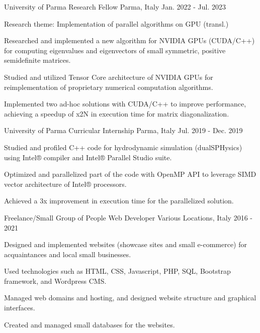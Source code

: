 \begin{cventries}
\cventry
    {University of Parma} %
    {Research Fellow} %
    {Parma, Italy} %
    {Jan. 2022 - Jul. 2023} %
    {
        \begin{cvitems} %
            \item {Research theme: Implementation of parallel algorithms on GPU (transl.)}
            \item {Researched and implemented a new algorithm for NVIDIA GPUs (CUDA/C++)
            for computing eigenvalues and eigenvectors of small symmetric, positive
            semidefinite matrices.}
            \item {Studied and utilized Tensor Core architecture of NVIDIA GPUs for
            reimplementation of proprietary numerical computation algorithms.}
            \item {Implemented two ad-hoc solutions with CUDA/C++ to improve performance,
            achieving a speedup of x2N in execution time for matrix diagonalization.}
        \end{cvitems}
    }

\cventry
    {University of Parma} %
    {Curricular Internship} %
    {Parma, Italy} %
    {Jul. 2019 - Dec. 2019} %
    {
        \begin{cvitems} %
            \item {Studied and profiled C++ code for hydrodynamic simulation (dualSPHysics)
            using Intel® compiler and Intel® Parallel Studio suite.}
            \item {Optimized and parallelized part of the code with OpenMP API to leverage
            SIMD vector architecture of Intel® processors.}
            \item {Achieved a 3x improvement in execution time for the parallelized
            solution.}
        \end{cvitems}
    }

\cventry
    {Freelance/Small Group of People} %
    {Web Developer} %
    {Various Locations, Italy} %
    {2016 - 2021} %
    {
            \begin{cvitems} %
            \item {Designed and implemented websites (showcase sites and small e-commerce)
            for acquaintances and local small businesses.}
            \item {Used technologies such as HTML, CSS, Javascript, PHP, SQL, Bootstrap
            framework, and Wordpress CMS.}
            \item {Managed web domains and hosting, and designed website structure and
            graphical interfaces.}
            \item {Created and managed small databases for the websites.}
            \end{cvitems}
    }

\end{cventries}
